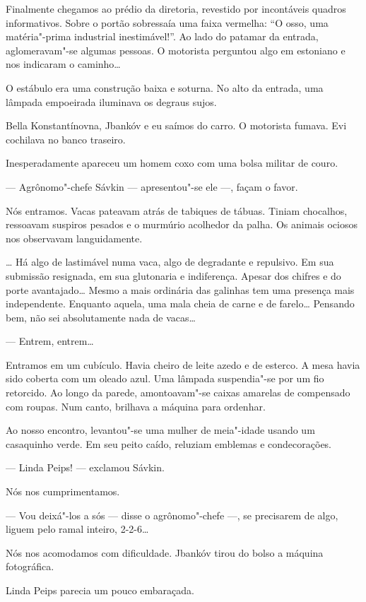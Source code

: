 Finalmente chegamos ao prédio da diretoria, revestido por incontáveis
quadros informativos. Sobre o portão sobressaía uma faixa vermelha: ``O
osso, uma matéria"-prima industrial inestimável!''. Ao lado do patamar da
entrada, aglomeravam"-se algumas pessoas. O motorista perguntou algo em
estoniano e nos indicaram o caminho\ldots{}

O estábulo era uma construção baixa e soturna. No alto da entrada, uma
lâmpada empoeirada iluminava os degraus sujos.

Bella Konstantínovna, Jbankóv e eu saímos do carro. O motorista fumava.
Evi cochilava no banco traseiro.

Inesperadamente apareceu um homem coxo com uma bolsa militar de couro.

--- Agrônomo"-chefe Sávkin --- apresentou"-se ele ---, façam o favor.

Nós entramos. Vacas pateavam atrás de tabiques de tábuas. Tiniam
chocalhos, ressoavam suspiros pesados e o murmúrio acolhedor da palha.
Os animais ociosos nos observavam languidamente.

\ldots{} Há algo de lastimável numa vaca, algo de degradante e repulsivo. Em
sua submissão resignada, em sua glutonaria e indiferença. Apesar dos
chifres e do porte avantajado\ldots{} Mesmo a mais ordinária das galinhas tem
uma presença mais independente. Enquanto aquela, uma mala cheia de carne
e de farelo\ldots{} Pensando bem, não sei absolutamente nada de vacas\ldots{}

--- Entrem, entrem\ldots{}

Entramos em um cubículo. Havia cheiro de leite azedo e de esterco. A
mesa havia sido coberta com um oleado azul. Uma lâmpada suspendia"-se por
um fio retorcido. Ao longo da parede, amontoavam"-se caixas amarelas de
compensado com roupas. Num canto, brilhava a máquina para ordenhar.

Ao nosso encontro, levantou"-se uma mulher de meia"-idade usando um
casaquinho verde. Em seu peito caído, reluziam emblemas e condecorações.

--- Linda Peips! --- exclamou Sávkin.

Nós nos cumprimentamos.

--- Vou deixá"-los a sós --- disse o agrônomo"-chefe
---, se precisarem de algo, liguem pelo ramal inteiro, 2-2-6\ldots{}

Nós nos acomodamos com dificuldade. Jbankóv tirou do bolso a máquina
fotográfica.

Linda Peips parecia um pouco embaraçada.

